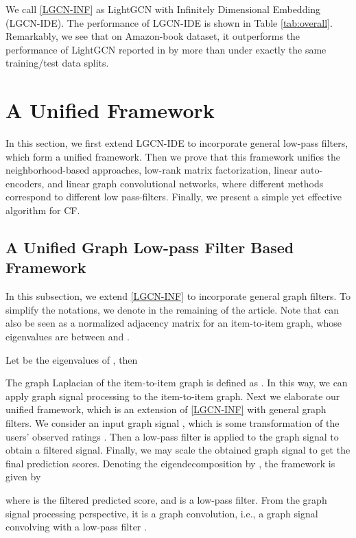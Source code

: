 \documentclass[sigconf]{acmart}
\begin{document}
We call \eqref{LGCN-INF} as LightGCN with Infinitely Dimensional Embedding (LGCN-IDE). The performance of LGCN-IDE is shown in Table \ref{tab:overall}. Remarkably, we see that on Amazon-book dataset, it outperforms the performance of LightGCN reported in \cite{he2020lightgcn} by more than  under exactly the same training/test data splits.
 
\section{A Unified Framework}
\label{sec:framework}
In this section, we first extend LGCN-IDE to incorporate general low-pass filters, which form a unified framework. Then we prove that this framework unifies the neighborhood-based approaches, low-rank matrix factorization, linear auto-encoders, and linear graph convolutional networks, where different methods correspond to different low pass-filters. Finally, we present a simple yet effective algorithm for CF. 

\subsection{A Unified Graph Low-pass Filter Based Framework} 
In this subsection, we extend \eqref{LGCN-INF} to incorporate general graph filters. To simplify the notations, we denote  in the remaining of the article. Note that  can also be seen as a normalized adjacency matrix for an item-to-item graph, whose eigenvalues are between  and . 

\begin{theorem} \label{thm:P}
    Let  be the eigenvalues of , then
    
\end{theorem}
The graph Laplacian of the item-to-item graph is defined as . In this way, we can apply graph signal processing to the item-to-item graph. Next we elaborate our unified framework, which is an extension of \eqref{LGCN-INF} with general graph filters. We consider an input graph signal , which is some transformation of the users' observed ratings . Then a low-pass filter is applied to the graph signal to obtain a filtered signal. Finally, we may scale the obtained graph signal to get the final prediction scores. Denoting the eigendecomposition by , the framework is given by 

where  is the filtered predicted score, and  is a low-pass filter. From the graph signal processing perspective, it is a graph convolution, i.e., a graph signal  convolving with a low-pass filter .
\end{document}
